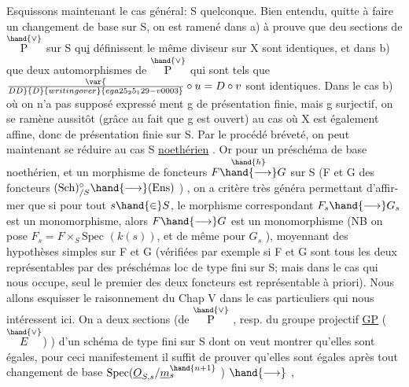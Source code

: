 Esquissons maintenant le cas général: S quelconque.  Bien entendu,
quitte à faire un changement de base sur S, on est ramené dans a) à prouve
que deu sections  de $\overset{\hand{\vee}}{\mathrm{P}}$ sur S  qu\uline{i} définissent le même diviseur sur X sont
identiques, et dans b) que deux automorphismes  de $\overset{\hand{\vee}}{\mathrm{P}}$  qui sont tels que
$\var{\over{D}{D}}{D}{writing over}{ega25_25_129-v0003}\circ u = D\circ v$  sont identiques.  Dans le cas b) où on n'a pas supposé expressé%
ment  g de présentation finie, mais g surjectif, on se ramène aussitôt
(grâce au fait que g est ouvert) au cas où X est également affine, donc
de présentation finie sur S.  Par le procédé bréveté, on peut maintenant
se réduire au cas S \uline{noethérien} .  Or pour un préschéma de base  noethérien,
et un morphisme de foncteurs  $F \overset{\hand{h}}{\hand{\longrightarrow}} G$ sur S  (F et G des foncteurs
$(\mathrm{Sch})_{/S}^{\circ} \hand{\longrightarrow} (\mathrm{Ens})$ ) ,  on a  critère très généra  permettant d'affir-%
mer que si  pour tout  $s \hand{\in} S$, le morphisme correspondant $F_s \hand{\longrightarrow} G_s$ est
un monomorphisme, alors $F \hand{\longrightarrow} G$ est un monomorphisme  (NB on pose $F_s{=}F\times_S\mathrm{Spec}$
$(k(s))$, et de même pour $G_s$ ),  moyennant des hypothèses simples sur F et G
(vérifiées par exemple si F et G sont tous les deux représentables par des
préschémas loc de type fini sur S; mais dans le cas qui nous occupe, seul
le premier des deux foncteurs est représentable à priori).  Nous allons
esquisser le raisonnement du Chap V  dans le  cas particuliers qui nous
intéressent ici.  On a deux sections  (de $\overset{\hand{\vee}}{\mathrm{P}}$ , resp. du groupe projectif
\uline{GP} ($\overset{\hand{\vee}}{E}$) ) d'un schéma de type fini  sur S dont on veut montrer qu'elles
sont égales, pour ceci manifestement il suffit de prouver qu'elles sont
égales après tout changement de base  $\mathrm{Spec}(\underline{O}_{S,s}/\underline{m}_s^{\hand{n+1}}$ ) $\hand{\longrightarrow}$ ,

